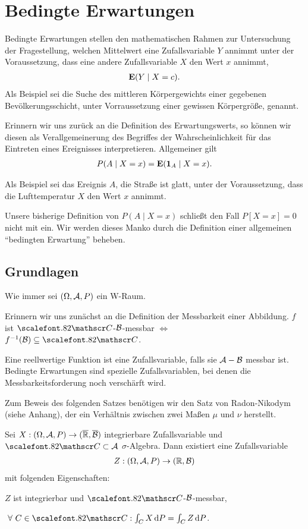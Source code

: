 \chapter{Bedingte Erwartungen}

Bedingte Erwartungen stellen den mathematischen Rahmen zur Untersuchung der
Fragestellung, welchen Mittelwert eine Zufallsvariable $Y$ annimmt unter der 
Voraussetzung, dass eine andere Zufallsvariable $X$ den Wert $x$
annimmt,
\begin{align*}
\E(Y\mid X=c).
\end{align*}
Als Beispiel sei die Suche des mittleren Körpergewichts einer gegebenen
Bevölkerungsschicht, unter Vorraussetzung einer gewissen Körpergröße, genannt.

Erinnern wir uns zurück an die Definition des Erwartungswerts, so können wir
diesen als Verallgemeinerung des Begriffes der Wahrscheinlichkeit für das
Eintreten eines Ereignisses interpretieren.
Allgemeiner gilt
\begin{align*}
P(A\mid X=x)=\E(\Id_A\mid X=x).
\end{align*}

Als Beispiel sei das Ereignis $A$, die Straße ist glatt, unter der
Voraussetzung, dass die Lufttemperatur $X$ den Wert $x$ annimmt.

Unsere bisherige Definition von $P(A\mid X=x)$ schließt den Fall $P[X=x]=0$
nicht mit ein. Wir werden dieses Manko durch die Definition einer allgemeinen
``bedingten Erwartung'' beheben.
\clearpage

\section{Grundlagen}

Wie immer sei $(\Omega,\AA,P)$ ein W-Raum.

Erinnern wir uns zunächst an die Definition der Messbarkeit einer
Abbildung. $f$ ist $\CC$-$\BB$-messbar $\Leftrightarrow$ $f^{-1}(\BB)
\subseteq \CC$.

Eine reellwertige Funktion ist eine Zufallsvariable, falls sie $\AA-\BB$
messbar ist. Bedingte Erwartungen sind spezielle Zufallsvariablen, bei denen
die Messbarkeitsforderung noch verschärft wird.

Zum Beweis des folgenden Satzes benötigen wir den Satz von Radon-Nikodym (siehe
Anhang), der ein Verhältnis zwischen zwei Maßen $\mu$ und $\nu$ herstellt.

\begin{prop}
\label{prop:10.1}
Sei $X: (\Omega, {\AA},P)\to (\RA, \overline{\BB})$ integrierbare
Zufallsvariable und ${\CC} \subset {\AA}$ $\sigma $-Algebra. Dann existiert
eine Zufallsvariable
\begin{align*}
Z : (\Omega, {\AA}, P) \to (\R,{\BB})
\end{align*}
mit folgenden Eigenschaften:
\begin{defnpropenum}
\item\label{prop:10.1:1}
$Z$ ist integrierbar und ${\CC}$-${\BB}$-messbar,
\item\label{prop:10.1:2}
$\forall C\in {\CC} : \int_{C}X\dP = \int_{C}Z\dP$.\fishhere
\end{defnpropenum}
\end{prop}

